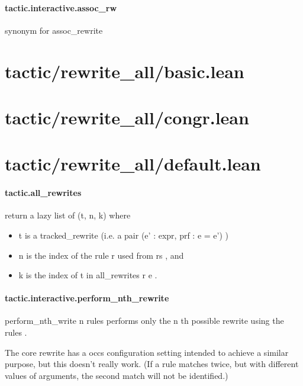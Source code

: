 \documentclass{article}
\begin{document}
\paragraph{tactic.interactive.assoc\_rw}
\par
synonym for 
\colorbox[RGB]{253,246,227}{{{{\color[RGB]{101, 123, 131} assoc\_rewrite }}}}\section{tactic/rewrite\_all/basic.lean}\section{tactic/rewrite\_all/congr.lean}\section{tactic/rewrite\_all/default.lean}\paragraph{tactic.all\_rewrites}
\par
return a lazy list of (t, n, k) where
\begin{itemize}\item \colorbox[RGB]{253,246,227}{{{{\color[RGB]{101, 123, 131} t }}}} is a 
\colorbox[RGB]{253,246,227}{{{{\color[RGB]{101, 123, 131} tracked\_rewrite }}}} (i.e. a pair 
\colorbox[RGB]{253,246,227}{{{{\color[RGB]{101, 123, 131} (e' : expr, prf : e  }}}{{{\color[RGB]{181, 137, 0} = }}}{{{\color[RGB]{101, 123, 131}  e') }}}})

\item \colorbox[RGB]{253,246,227}{{{{\color[RGB]{101, 123, 131} n }}}} is the index of the rule 
\colorbox[RGB]{253,246,227}{{{{\color[RGB]{101, 123, 131} r }}}} used from 
\colorbox[RGB]{253,246,227}{{{{\color[RGB]{101, 123, 131} rs }}}}, and

\item \colorbox[RGB]{253,246,227}{{{{\color[RGB]{101, 123, 131} k }}}} is the index of 
\colorbox[RGB]{253,246,227}{{{{\color[RGB]{101, 123, 131} t }}}} in 
\colorbox[RGB]{253,246,227}{{{{\color[RGB]{101, 123, 131} all\_rewrites r e }}}}.

\end{itemize}\paragraph{tactic.interactive.perform\_nth\_rewrite}
\par
\colorbox[RGB]{253,246,227}{{{{\color[RGB]{101, 123, 131} perform\_nth\_write n rules }}}} performs only the 
\colorbox[RGB]{253,246,227}{{{{\color[RGB]{101, 123, 131} n }}}}th possible rewrite using the 
\colorbox[RGB]{253,246,227}{{{{\color[RGB]{101, 123, 131} rules }}}}.
\par
The core 
\colorbox[RGB]{253,246,227}{{{{\color[RGB]{101, 123, 131} rewrite }}}} has a 
\colorbox[RGB]{253,246,227}{{{{\color[RGB]{101, 123, 131} occs }}}} configuration setting intended to achieve a similar
purpose, but this doesn't really work. (If a rule matches twice, but with different
values of arguments, the second match will not be identified.)
\end{document}
